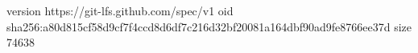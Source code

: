version https://git-lfs.github.com/spec/v1
oid sha256:a80d815cf58d9cf7f4ccd8d6df7c216d32bf20081a164dbf90ad9fe8766ee37d
size 74638
